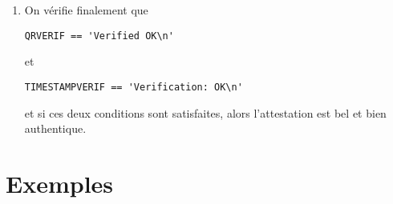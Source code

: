 \documentclass[12pt]{article}
\newcommand{\1}{\mathbbm{1}}
\begin{document}
\begin{enumerate}[label=(\arabic*)]
\begin{lstlisting}
(revers,ignorer)=l.communicate()
TIMESTAMPVERIF=revers.decode()
\end{lstlisting}
\vspace*{7mm}	

\item On vérifie finalement que 
\begin{lstlisting}
QRVERIF == 'Verified OK\n' 
\end{lstlisting}
\vspace*{7mm}
et 
\begin{lstlisting}
TIMESTAMPVERIF == 'Verification: OK\n' 
\end{lstlisting}
\vspace*{7mm}
et si ces deux conditions sont satisfaites, alors l'attestation est bel et bien authentique.

\end{enumerate}




\pagebreak

\section{Exemples}










\end{document}
